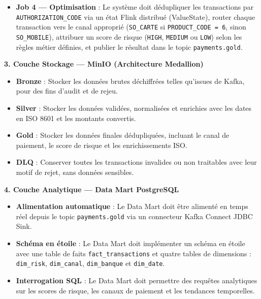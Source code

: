 \begin{itemize}[leftmargin=1.5cm]
    \item \textbf{Job 4 --- Optimisation} : Le système doit dédupliquer les transactions par \texttt{AUTHORIZATION\_CODE} via un état Flink distribué (ValueState), router chaque transaction vers le canal approprié (\texttt{SO\_CARTE} si \texttt{PRODUCT\_CODE = 6}, sinon \texttt{SO\_MOBILE}), attribuer un score de risque (\texttt{HIGH}, \texttt{MEDIUM} ou \texttt{LOW}) selon les règles métier définies, et publier le résultat dans le topic \texttt{payments.gold}.
\end{itemize}

\vspace{0.3cm}
\textbf{3. Couche Stockage --- MinIO (Architecture Medallion)}

\begin{itemize}[leftmargin=1.5cm]
    \item \textbf{Bronze} : Stocker les données brutes déchiffrées telles qu'issues de Kafka, pour des fins d'audit et de rejeu.
    \item \textbf{Silver} : Stocker les données validées, normalisées et enrichies avec les dates en ISO 8601 et les montants convertis.
    \item \textbf{Gold} : Stocker les données finales dédupliquées, incluant le canal de paiement, le score de risque et les enrichissements ISO.
    \item \textbf{DLQ} : Conserver toutes les transactions invalides ou non traitables avec leur motif de rejet, sans données sensibles.
\end{itemize}

\vspace{0.3cm}
\textbf{4. Couche Analytique --- Data Mart PostgreSQL}

\begin{itemize}[leftmargin=1.5cm]
    \item \textbf{Alimentation automatique} : Le Data Mart doit être alimenté en temps réel depuis le topic \texttt{payments.gold} via un connecteur Kafka Connect JDBC Sink.
    \item \textbf{Schéma en étoile} : Le Data Mart doit implémenter un schéma en étoile avec une table de faits \texttt{fact\_transactions} et quatre tables de dimensions : \texttt{dim\_risk}, \texttt{dim\_canal}, \texttt{dim\_banque} et \texttt{dim\_date}.
    \item \textbf{Interrogation SQL} : Le Data Mart doit permettre des requêtes analytiques sur les scores de risque, les canaux de paiement et les tendances temporelles.
\end{itemize}


